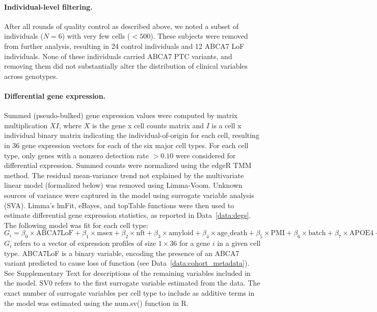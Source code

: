 \paragraph{Individual-level filtering.}
After all rounds of quality control as described above, we noted a subset of individuals ($N=6$) with very few cells ($<500$). These subjects were removed from further analysis, resulting in 24 control individuals and 12 ABCA7 LoF individuals. None of these individuals carried ABCA7 PTC variants, and removing them did not substantially alter the distribution of clinical variables across genotypes.

\paragraph{Differential gene expression.}
Summed (pseudo-bulked) gene expression values were computed by matrix multiplication $ X I $, where $ X $ is the gene x cell counts matrix and $ I $ is a cell x individual binary matrix indicating the individual-of-origin for each cell, resulting in 36 gene expression vectors for each of the six major cell types. For each cell type, only genes with a nonzero detection rate $ > 0.10 $ were considered for differential expression. Summed counts were normalized using the edgeR TMM method. The residual mean-variance trend not explained by the multivariate linear model (formalized below) was removed using Limma-Voom. Unknown sources of variance were captured in the model using surrogate variable analysis (SVA). Limma’s lmFit, eBayes, and topTable functions were then used to estimate differential gene expression statistics, as reported in Data~\ref{data:degs}. The following model was fit for each cell type:
$ G_i = \beta_0 \times \text{ABCA7LoF} + \beta_1 \times \text{msex} + \beta_2 \times \text{nft} + \beta_3 \times \text{amyloid} + \beta_4 \times \text{age\_death} + \beta_5 \times \text{PMI} + \beta_6 \times \text{batch} + \beta_7 \times \text{APOE4} + \beta_8 \times \text{SV0} $
$ G_i $ refers to a vector of expression profiles of size $ 1 \times 36 $ for a gene $ i $ in a given cell type. ABCA7LoF is a binary variable, encoding the presence of an ABCA7 variant predicted to cause loss of function (see Data~\ref{data:cohort_metadata}). See Supplementary Text for descriptions of the remaining variables included in the model. SV0 refers to the first surrogate variable estimated from the data. The exact number of surrogate variables per cell type to include as additive terms in the model was estimated using the num.sv() function in R. 

